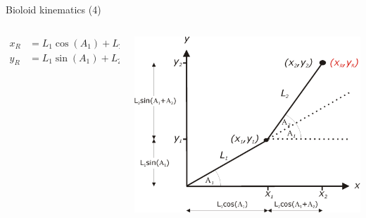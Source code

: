 \documentclass[compress]{beamer}
\begin{document}
\begin{frame}{Bioloid kinematics (4)}

    \begin{columns}
        \begin{column}{0.5\linewidth}

            \begin{align*}
                x_R &= L_1 \cos(A_1) + L_2 \cos(A_1+ A_2) \\
                y_R &= L_1 \sin(A_1) + L_2 \sin(A_1+ A_2)
            \end{align*}
        \end{column}
        \begin{column}{0.5\linewidth}

            \begin{center}
                \includegraphics[width=\linewidth]{image33}
            \end{center}
        \end{column}
    \end{columns}


\end{frame}
\end{document}
